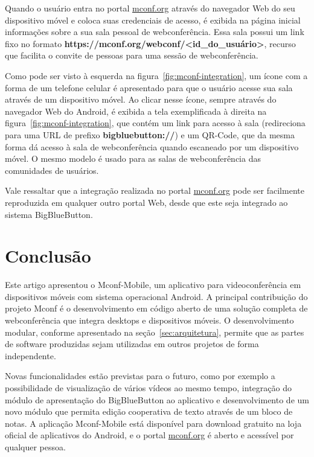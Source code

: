 \documentclass{acm_proc_article-sp}
\begin{document}
Quando o usuário entra no portal \url{mconf.org} através do navegador Web do seu dispositivo móvel e coloca suas credenciais de acesso, é exibida na página inicial informações sobre a sua sala pessoal de webconferência. Essa sala possui um link fixo no formato \textbf{https://mconf.org/webconf/<id\_do\_usuário>}, recurso que facilita o convite de pessoas para uma sessão de webconferência.

Como pode ser visto à esquerda na figura~\ref{fig:mconf-integration}, um ícone com a forma de um telefone celular é apresentado para que o usuário acesse sua sala através de um dispositivo móvel. Ao clicar nesse ícone, sempre através do navegador Web do Android, é exibida a tela exemplificada à direita na figura~\ref{fig:mconf-integration}, que contém um link para acesso à sala (redireciona para uma URL de prefixo \textbf{bigbluebutton://}) e um QR-Code, que da mesma forma dá acesso à sala de webconferência quando escaneado por um dispositivo móvel. O mesmo modelo é usado para as salas de webconferência das comunidades de usuários.

Vale ressaltar que a integração realizada no portal \url{mconf.org} pode ser facilmente reproduzida em qualquer outro portal Web, desde que este seja integrado ao sistema BigBlueButton.

\section{Conclusão}

Este artigo apresentou o Mconf-Mobile, um aplicativo para videoconferência em dispositivos móveis com sistema operacional Android. A principal contribuição do projeto Mconf é o desenvolvimento em código aberto de uma solução completa de webconferência que integra desktops e dispositivos móveis. O desenvolvimento modular, conforme apresentado na seção~\ref{sec:arquitetura}, permite que as partes de software produzidas sejam utilizadas em outros projetos de forma independente.

Novas funcionalidades estão previstas para o futuro, como por exemplo a possibilidade de visualização de vários vídeos ao mesmo tempo, integração do módulo de apresentação do BigBlueButton ao aplicativo e desenvolvimento de um novo módulo que permita edição cooperativa de texto através de um bloco de notas. A aplicação Mconf-Mobile está disponível para download gratuito na loja oficial de aplicativos do Android, e o portal \url{mconf.org} é aberto e acessível por qualquer pessoa.

%

%
%
\balancecolumns
\end{document}
